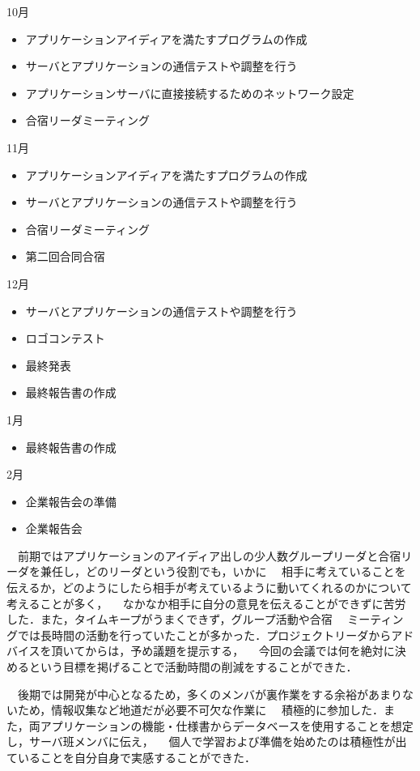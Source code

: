10月
\begin{itemize}
\item アプリケーションアイディアを満たすプログラムの作成
\item サーバとアプリケーションの通信テストや調整を行う
\item アプリケーションサーバに直接接続するためのネットワーク設定
\item 合宿リーダミーティング
\end{itemize}
11月
\begin{itemize}
\item アプリケーションアイディアを満たすプログラムの作成
\item サーバとアプリケーションの通信テストや調整を行う
\item 合宿リーダミーティング
\item 第二回合同合宿
\end{itemize}
12月
\begin{itemize}
\item サーバとアプリケーションの通信テストや調整を行う
\item ロゴコンテスト
\item 最終発表
\item 最終報告書の作成
\end{itemize}
1月
\begin{itemize}
\item 最終報告書の作成
\end{itemize}
2月
\begin{itemize}
\item 企業報告会の準備
\item 企業報告会
\end{itemize}

\par
　前期ではアプリケーションのアイディア出しの少人数グループリーダと合宿リーダを兼任し，どのリーダという役割でも，いかに
　相手に考えていることを伝えるか，どのようにしたら相手が考えているように動いてくれるのかについて考えることが多く，
　なかなか相手に自分の意見を伝えることができずに苦労した．また，タイムキープがうまくできず，グループ活動や合宿
　ミーティングでは長時間の活動を行っていたことが多かった．プロジェクトリーダからアドバイスを頂いてからは，予め議題を提示する，
　今回の会議では何を絶対に決めるという目標を掲げることで活動時間の削減をすることができた．
\par
　後期では開発が中心となるため，多くのメンバが裏作業をする余裕があまりないため，情報収集など地道だが必要不可欠な作業に
　積極的に参加した．また，両アプリケーションの機能・仕様書からデータベースを使用することを想定し，サーバ班メンバに伝え，
　個人で学習および準備を始めたのは積極性が出ていることを自分自身で実感することができた．

